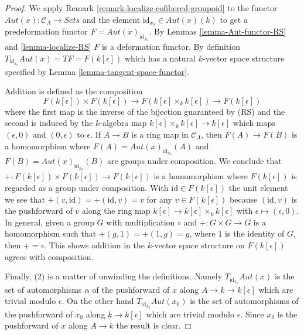 \begin{proof}
We apply
Remark \ref{remark-localize-cofibered-groupoid}
to the functor $\mathit{Aut}(x) : \mathcal{C}_A \to \textit{Sets}$
and the element $\text{id}_{x_0} \in \mathit{Aut}(x)(k)$ to get
a predeformation functor $F = \mathit{Aut}(x)_{\text{id}_{x_0}}$. By
Lemmas \ref{lemma-Aut-functor-RS} and \ref{lemma-localize-RS}
$F$ is a deformation functor. By definition
$T_{\text{id}_{x_0}} \mathit{Aut}(x) = TF = F(k[\epsilon])$
which has a natural
$k$-vector space structure specified by Lemma
\ref{lemma-tangent-space-functor}.

\medskip\noindent
Addition is defined as the composition
$$
F(k[\epsilon]) \times F(k[\epsilon]) \longrightarrow
F(k[\epsilon] \times_k k[\epsilon]) \longrightarrow
F(k[\epsilon])
$$
where the first map is the inverse of the bijection guaranteed by (RS) and the
second is induced by the $k$-algebra map
$k[\epsilon] \times_k k[\epsilon] \to k[\epsilon]$
which maps $(\epsilon, 0)$ and $(0, \epsilon)$ to $\epsilon$.
If $A \to B$ is a ring map in $\mathcal{C}_\Lambda$, then $F(A) \to F(B)$
is a homomorphism where $F(A) = \mathit{Aut}(x)_{\text{id}_{x_0}}(A)$ and
$F(B) = \mathit{Aut}(x)_{\text{id}_{x_0}}(B)$ are groups under
composition. We conclude that
$+ : F(k[\epsilon]) \times F(k[\epsilon])\to F(k[\epsilon])$
is a homomorphism where $F(k[\epsilon])$ is regarded as a
group under composition. With $\text{id} \in F(k[\epsilon])$ the
unit element we see that $+(v, \text{id}) =
+(\text{id}, v) = v$ for any $v \in F(k[\epsilon])$ because
$(\text{id}, v)$ is the pushforward of $v$ along the ring map
$k[\epsilon] \to k[\epsilon] \times_k k[\epsilon]$ with
$\epsilon \mapsto (\epsilon, 0)$.
In general, given a group $G$ with multiplication $\circ$
and $+ : G \times G \to G$ is a homomorphism such that
$+(g, 1) = +(1, g) = g$, where $1$ is the identity of $G$, then $+ = \circ$.
This shows addition in the $k$-vector space structure on $F(k[\epsilon])$
agrees with composition.

\medskip\noindent
Finally, (2) is a matter of unwinding the definitions. Namely
$T_{\text{id}_{x_0}} \mathit{Aut}(x)$ is the set of
automorphisms $\alpha$ of the pushforward of $x$ along
$A \to k \to k[\epsilon]$ which are trivial modulo $\epsilon$.
On the other hand $T_{\text{id}_{x_0}} \mathit{Aut}(x_0)$ is the set of
automorphisms of the pushforward of $x_0$ along
$k \to k[\epsilon]$ which are trivial modulo $\epsilon$.
Since $x_0$ is the pushforward of $x$ along $A \to k$ the result
is clear.
\end{proof}

